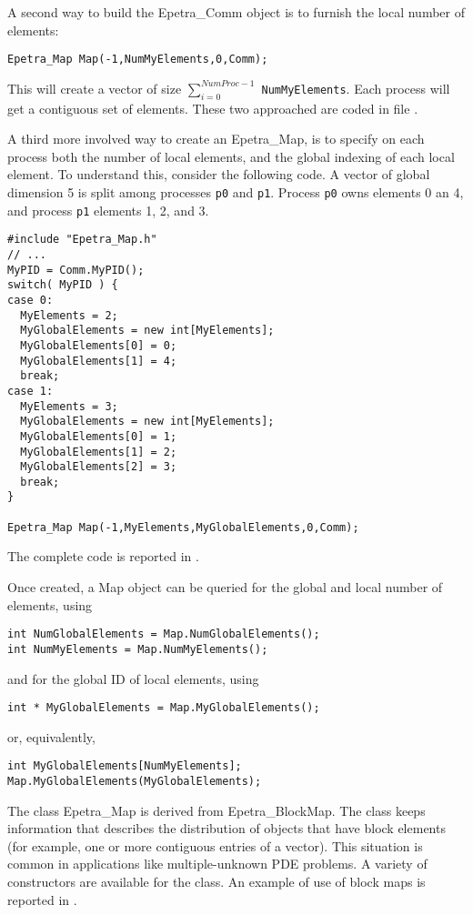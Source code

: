 A second way to build the Epetra\_Comm object is to furnish the local
number of elements:
\begin{verbatim}
Epetra_Map Map(-1,NumMyElements,0,Comm);
\end{verbatim}
This will create a vector of size $\sum_{i=0}^{NumProc-1}$
\verb!NumMyElements!. Each process will get a contiguous set of elements.
These two approached are coded in file \newline {}.

A third more involved way to create an Epetra\_Map, is to specify on
each process both the number of local elements, and the global indexing
of each local element. To understand this, consider the following code.
A vector of global dimension 5 is split among processes \verb!p0! and
\verb!p1!. Process \verb!p0! owns elements 0 an 4, and process \verb!p1!
elements 1, 2, and 3.
\begin{verbatim}
#include "Epetra_Map.h"
// ...
MyPID = Comm.MyPID();
switch( MyPID ) {
case 0:
  MyElements = 2;
  MyGlobalElements = new int[MyElements];
  MyGlobalElements[0] = 0;
  MyGlobalElements[1] = 4;
  break;
case 1:
  MyElements = 3;
  MyGlobalElements = new int[MyElements];
  MyGlobalElements[0] = 1;
  MyGlobalElements[1] = 2;
  MyGlobalElements[2] = 3;
  break;
}

Epetra_Map Map(-1,MyElements,MyGlobalElements,0,Comm);
\end{verbatim}
The complete code is reported in .

Once created, a Map object can be queried for the global and local
number of elements, using
\begin{verbatim}
int NumGlobalElements = Map.NumGlobalElements();
int NumMyElements = Map.NumMyElements();
\end{verbatim}
and for the global ID of local elements, using
\begin{verbatim}
int * MyGlobalElements = Map.MyGlobalElements();
\end{verbatim}
or, equivalently,
\begin{verbatim}
int MyGlobalElements[NumMyElements];
Map.MyGlobalElements(MyGlobalElements);
\end{verbatim}

\bigskip

The class Epetra\_Map is derived from Epetra\_BlockMap. The class keeps
information that describes the distribution of objects that have block
elements (for example, one or more contiguous entries of a vector). This
situation is common in applications like multiple-unknown PDE problems.
A variety of constructors are available for the class. An example of
use of block maps is reported in .

